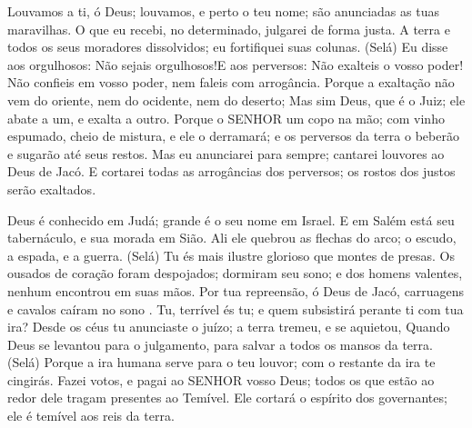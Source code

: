 {\PP 
  Louvamos a ti, ó Deus; louvamos, e perto
{} o teu nome; são anunciadas as tuas maravilhas.
  O que eu recebi, no
{} determinado, julgarei de forma justa.
  A terra e todos os seus moradores
{} dissolvidos;
{} eu fortifiquei suas colunas. (Selá)
  Eu disse aos orgulhosos: Não sejais orgulhosos!E aos perversos: Não exalteis o vosso poder!
  Não confieis em vosso poder,
 nem faleis com arrogância.
  Porque a exaltação não vem do oriente, nem do ocidente, nem do deserto;
  Mas sim
{} Deus, que é o Juiz; ele abate a um, e exalta a outro.
  Porque o SENHOR
{} um copo na mão; com vinho espumado, cheio de mistura, e ele o derramará; e os perversos da terra o beberão e sugarão até seus restos.
  Mas eu
{} anunciarei para sempre; cantarei louvores ao Deus de Jacó.
  E cortarei todas as arrogâncias dos perversos;
{} os rostos dos justos serão exaltados.
\par }


{\PP 
  Deus é conhecido em Judá; grande é o seu nome em Israel.
  E em Salém está seu tabernáculo, e sua morada em Sião.
  Ali ele quebrou as flechas do arco; o escudo, a espada, e a guerra. (Selá)
  Tu és mais ilustre
{} glorioso que montes de presas.
  Os ousados de coração foram despojados; dormiram seu sono; e dos homens valentes, nenhum encontrou
{} em suas mãos.
  Por tua repreensão, ó Deus de Jacó, carruagens e cavalos caíram no sono
{} .
  Tu, terrível és tu; e quem subsistirá perante ti com tua ira?
  Desde os céus tu anunciaste o juízo; a terra tremeu, e se aquietou,
  Quando Deus se levantou para o julgamento, para salvar a todos os mansos da terra. (Selá)
  Porque a ira humana serve para o teu louvor; com o restante da ira te cingirás.
  Fazei votos, e
{} pagai ao SENHOR vosso Deus; todos os que estão ao redor dele tragam presentes ao Temível.
  Ele cortará o espírito dos governantes; ele é temível aos reis da terra.
\par }


